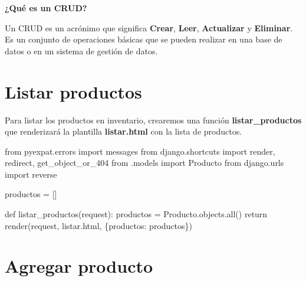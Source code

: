 \documentclass[
  a4paper,
  DIV=11,
  numbers=noendperiod,
  onepage,
  openany]{scrreprt}
\newenvironment{Shaded}{\begin{snugshade}}{\end{snugshade}}
\newcommand{\BuiltInTok}[1]{\textcolor[rgb]{0.00,0.23,0.31}{#1}}
\newcommand{\ControlFlowTok}[1]{\textcolor[rgb]{0.00,0.23,0.31}{#1}}
\newcommand{\ImportTok}[1]{\textcolor[rgb]{0.00,0.46,0.62}{#1}}
\newcommand{\KeywordTok}[1]{\textcolor[rgb]{0.00,0.23,0.31}{#1}}
\newcommand{\NormalTok}[1]{\textcolor[rgb]{0.00,0.23,0.31}{#1}}
\newcommand{\OperatorTok}[1]{\textcolor[rgb]{0.37,0.37,0.37}{#1}}
\newcommand{\StringTok}[1]{\textcolor[rgb]{0.13,0.47,0.30}{#1}}
\begin{document}
\begin{tcolorbox}[enhanced jigsaw, title=\textcolor{quarto-callout-tip-color}{\faLightbulb}\hspace{0.5em}{Tip}, colback=white, rightrule=.15mm, opacityback=0, colframe=quarto-callout-tip-color-frame, titlerule=0mm, opacitybacktitle=0.6, breakable, coltitle=black, colbacktitle=quarto-callout-tip-color!10!white, bottomtitle=1mm, toptitle=1mm, left=2mm, arc=.35mm, toprule=.15mm, leftrule=.75mm, bottomrule=.15mm]

\textbf{¿Qué es un CRUD?}

Un CRUD es un acrónimo que significa \textbf{Crear}, \textbf{Leer},
\textbf{Actualizar} y \textbf{Eliminar}. Es un conjunto de operaciones
básicas que se pueden realizar en una base de datos o en un sistema de
gestión de datos.

\end{tcolorbox}

\section{Listar productos}\label{listar-productos}

Para listar los productos en inventario, crearemos una función
\textbf{listar\_productos} que renderizará la plantilla
\textbf{listar.html} con la lista de productos.

\begin{Shaded}
\begin{Highlighting}[]
\ImportTok{from}\NormalTok{ pyexpat.errors }\ImportTok{import}\NormalTok{ messages}
\ImportTok{from}\NormalTok{ django.shortcuts }\ImportTok{import}\NormalTok{ render, redirect, get\_object\_or\_404}
\ImportTok{from}\NormalTok{ .models }\ImportTok{import}\NormalTok{ Producto}
\ImportTok{from}\NormalTok{ django.urls }\ImportTok{import}\NormalTok{ reverse }

\NormalTok{productos }\OperatorTok{=}\NormalTok{ []}

\KeywordTok{def}\NormalTok{ listar\_productos(request):}
\NormalTok{    productos }\OperatorTok{=}\NormalTok{ Producto.objects.}\BuiltInTok{all}\NormalTok{()}
    \ControlFlowTok{return}\NormalTok{ render(request, }\StringTok{\textquotesingle{}listar.html\textquotesingle{}}\NormalTok{, \{}\StringTok{\textquotesingle{}productos\textquotesingle{}}\NormalTok{: productos\})}
\end{Highlighting}
\end{Shaded}

\section{Agregar producto}\label{agregar-producto}
\end{document}
